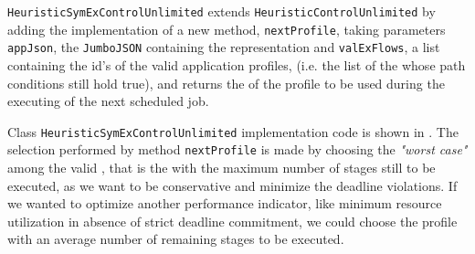 \texttt{HeuristicSymExControlUnlimited} extends \texttt{HeuristicControlUnlimited} by adding the implementation of a new method, \texttt{nextProfile}, taking parameters \texttt{appJson}, the \texttt{JumboJSON} containing the \model representation and \texttt{valExFlows}, a list containing the id's of the valid application profiles, (i.e. the list of the \plans whose path conditions still hold true), and returns the \plan of the profile to be used during the executing of the next scheduled job.

Class \texttt{HeuristicSymExControlUnlimited} implementation code is shown in . The \plan selection performed by method \texttt{nextProfile} is made by choosing the \textit{"worst case"} among the valid \plans, that is the \plan with the maximum number of stages still to be executed, as we want to be conservative and minimize the deadline violations. If we wanted to optimize another performance indicator, like minimum  resource utilization in absence of strict deadline commitment, we could choose the profile with an average number of remaining stages to be executed.

